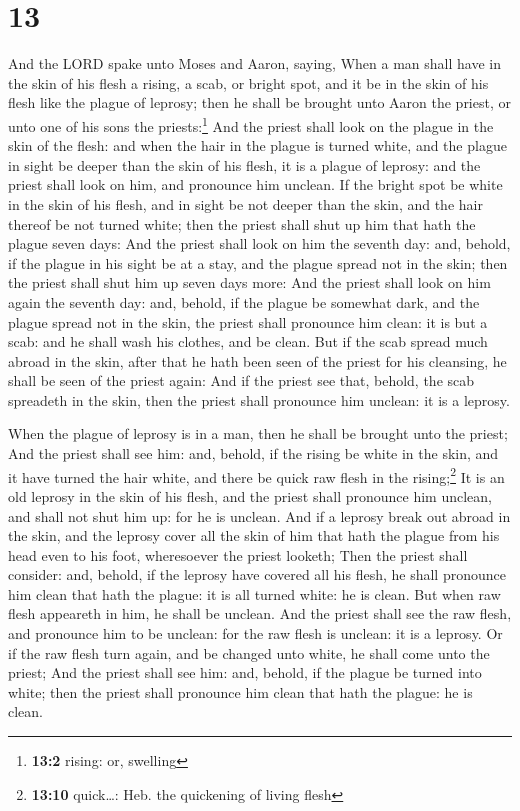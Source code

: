 \hypertarget{section-12}{%
\section{13}\label{section-12}}

 And the LORD spake unto Moses and Aaron, saying,
 When a man shall have in the skin of his flesh a rising,
a scab, or bright spot, and it be in the skin of his flesh like the
plague of leprosy; then he shall be brought unto Aaron the priest, or
unto one of his sons the priests:\footnote{\textbf{13:2} rising: or,
  swelling}  And the priest shall look on the plague in
the skin of the flesh: and when the hair in the plague is turned white,
and the plague in sight be deeper than the skin of his flesh, it is a
plague of leprosy: and the priest shall look on him, and pronounce him
unclean.  If the bright spot be white in the skin of his
flesh, and in sight be not deeper than the skin, and the hair thereof be
not turned white; then the priest shall shut up him that hath the plague
seven days:  And the priest shall look on him the seventh
day: and, behold, if the plague in his sight be at a stay, and the
plague spread not in the skin; then the priest shall shut him up seven
days more:  And the priest shall look on him again the
seventh day: and, behold, if the plague be somewhat dark, and the plague
spread not in the skin, the priest shall pronounce him clean: it is but
a scab: and he shall wash his clothes, and be clean.  But
if the scab spread much abroad in the skin, after that he hath been seen
of the priest for his cleansing, he shall be seen of the priest again:
 And if the priest see that, behold, the scab spreadeth in
the skin, then the priest shall pronounce him unclean: it is a leprosy.

 When the plague of leprosy is in a man, then he shall be
brought unto the priest;  And the priest shall see him:
and, behold, if the rising be white in the skin, and it have turned the
hair white, and there be quick raw flesh in the rising;\footnote{\textbf{13:10}
  quick\ldots: Heb. the quickening of living flesh}  It
is an old leprosy in the skin of his flesh, and the priest shall
pronounce him unclean, and shall not shut him up: for he is unclean.
 And if a leprosy break out abroad in the skin, and the
leprosy cover all the skin of him that hath the plague from his head
even to his foot, wheresoever the priest looketh;  Then
the priest shall consider: and, behold, if the leprosy have covered all
his flesh, he shall pronounce him clean that hath the plague: it is all
turned white: he is clean.  But when raw flesh appeareth
in him, he shall be unclean.  And the priest shall see
the raw flesh, and pronounce him to be unclean: for the raw flesh is
unclean: it is a leprosy.  Or if the raw flesh turn
again, and be changed unto white, he shall come unto the priest;
 And the priest shall see him: and, behold, if the plague
be turned into white; then the priest shall pronounce him clean that
hath the plague: he is clean.

